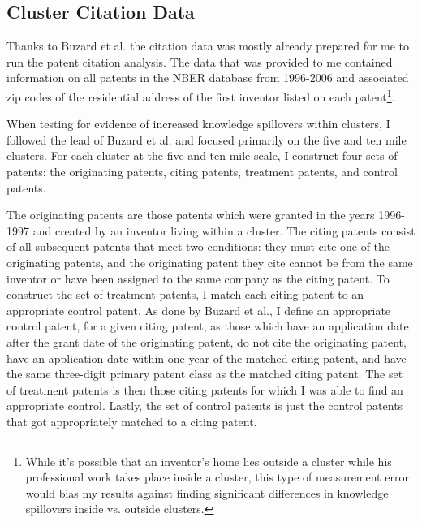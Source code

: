 \documentclass[12pt,letterpaper]{article}
\begin{document}
\subsection{Cluster Citation Data}\label{sec:2.2}
Thanks to Buzard et al. the citation data was mostly already prepared for me to run the patent citation analysis. The data that was provided to me contained information on all patents in the NBER database from 1996-2006 and associated zip codes of the residential address of the first inventor listed on each patent\footnote{While it’s possible that an
inventor’s home lies outside a cluster while his professional work takes place inside a cluster,
this type of measurement error would bias my results against finding significant differences in knowledge spillovers inside vs. outside clusters.}. 
\par
When testing for evidence of increased knowledge spillovers within clusters, I followed the lead of Buzard et al. and focused primarily on the five and ten mile clusters. For each cluster at the five and ten mile scale, I construct four sets of patents: the originating patents, citing patents, treatment patents, and control patents. 
\par
The originating patents are those patents which were granted in the years 1996-1997 and created by an inventor living within a cluster. The citing patents consist of all subsequent patents that meet two conditions: they must cite one of the originating patents, and the originating patent they cite cannot be from the same inventor or have been assigned to the same company as the citing patent. To construct the set of treatment patents, I match each citing patent to an appropriate control patent. As done by Buzard et al., I define an appropriate control patent, for a given citing patent, as those which have an application date after the grant date of the originating patent, do not cite the originating patent, have an application date within one year of the matched citing patent, and have the same three-digit primary patent class as the matched citing patent. The set of treatment patents is then those citing patents for which I was able to find an appropriate control. Lastly, the set of control patents is just the control patents that got appropriately matched to a citing patent. 
\end{document}
